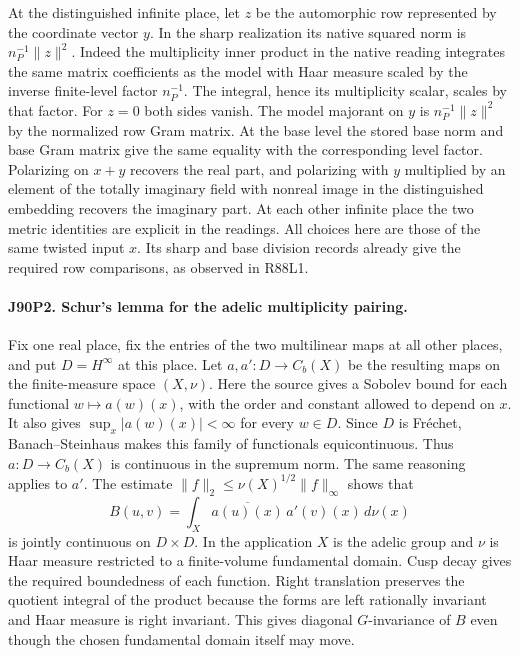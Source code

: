 At the distinguished infinite place, let $z$ be the automorphic
row represented by the coordinate vector $y$. In the sharp
realization its native squared norm is $n_P^{-1}\|z\|^2$.
Indeed the multiplicity inner product in the native reading
integrates the same matrix coefficients as the model with Haar
measure scaled by the inverse finite-level factor $n_P^{-1}$.
The integral, hence its multiplicity scalar, scales by that factor.
For $z=0$ both sides vanish. The model majorant on $y$ is
$n_P^{-1}\|z\|^2$ by the normalized row Gram matrix. At the
base level the stored base norm and base Gram matrix give the
same equality with the corresponding level factor. Polarizing on
$x+y$ recovers the real part, and polarizing with $y$ multiplied
by an element of the totally imaginary field with nonreal image in the
distinguished embedding recovers the imaginary part. At each other infinite
place the two metric identities are explicit in the readings.
All choices here are those of the same twisted input $x$.
Its sharp and base division records already give the required
row comparisons, as observed in R88L1.

\paragraph{J90P2. Schur's lemma for the adelic multiplicity pairing.}
Fix one real place, fix the entries of the two multilinear maps at
all other places, and put $D=H^\infty$ at this place. Let
$a,a':D\to C_b(X)$ be the resulting maps on the finite-measure space
$(X,\nu)$. Here the source gives a Sobolev bound for each functional
$w\mapsto a(w)(x)$, with the order and constant allowed to depend on
$x$. It also gives $\sup_x|a(w)(x)|<\infty$ for every $w\in D$.
Since $D$ is Fr\'echet, Banach--Steinhaus makes this family of
functionals equicontinuous. Thus $a:D\to C_b(X)$ is continuous in
the supremum norm. The same reasoning applies to $a'$. The estimate
$\|f\|_2\le\nu(X)^{1/2}\|f\|_\infty$ shows that
\[
 B(u,v)=\int_X\overline{a(u)(x)}\,a'(v)(x)\,d\nu(x)
\]
is jointly continuous on $D\times D$. In the application $X$ is
the adelic group and $\nu$ is Haar measure restricted to a
finite-volume fundamental domain. Cusp decay gives the required
boundedness of each function. Right translation preserves the
quotient integral of the product because the forms are left
rationally invariant and Haar measure is right invariant. This
gives diagonal $G$-invariance of $B$ even though the chosen
fundamental domain itself may move.

